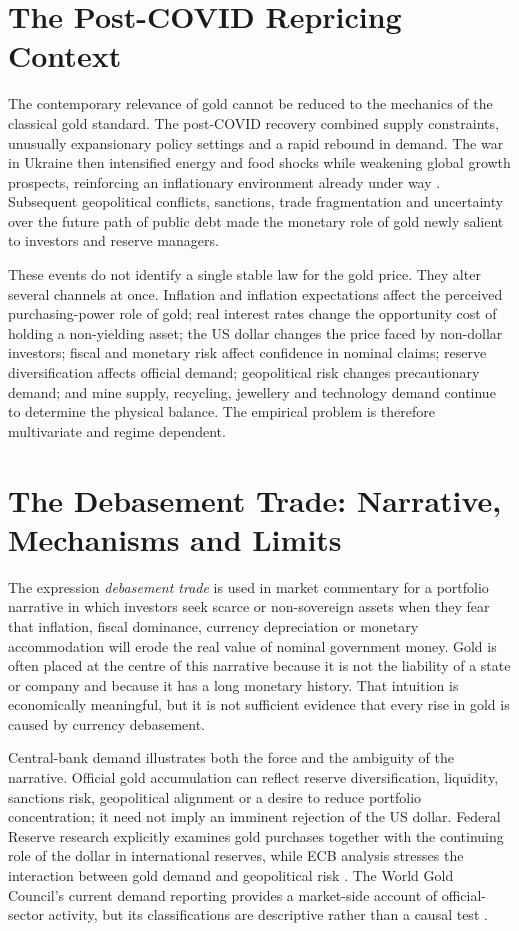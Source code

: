 \section{The Post-COVID Repricing Context}

The contemporary relevance of gold cannot be reduced to the mechanics of the
classical gold standard. The post-COVID recovery combined supply constraints,
unusually expansionary policy settings and a rapid rebound in demand. The war
in Ukraine then intensified energy and food shocks while weakening global
growth prospects, reinforcing an inflationary environment already under way
\cite{imf-war-inflation-2022}. Subsequent geopolitical conflicts, sanctions,
trade fragmentation and uncertainty over the future path of public debt made
the monetary role of gold newly salient to investors and reserve managers.

These events do not identify a single stable law for the gold price. They alter
several channels at once. Inflation and inflation expectations affect the
perceived purchasing-power role of gold; real interest rates change the
opportunity cost of holding a non-yielding asset; the US dollar changes the
price faced by non-dollar investors; fiscal and monetary risk affect confidence
in nominal claims; reserve diversification affects official demand;
geopolitical risk changes precautionary demand; and mine supply, recycling,
jewellery and technology demand continue to determine the physical balance.
The empirical problem is therefore multivariate and regime dependent.

\section{The Debasement Trade: Narrative, Mechanisms and Limits}

The expression \emph{debasement trade} is used in market commentary for a
portfolio narrative in which investors seek scarce or non-sovereign assets
when they fear that inflation, fiscal dominance, currency depreciation or
monetary accommodation will erode the real value of nominal government money.
Gold is often placed at the centre of this narrative because it is not the
liability of a state or company and because it has a long monetary history.
That intuition is economically meaningful, but it is not sufficient evidence
that every rise in gold is caused by currency debasement.

Central-bank demand illustrates both the force and the ambiguity of the
narrative. Official gold accumulation can reflect reserve diversification,
liquidity, sanctions risk, geopolitical alignment or a desire to reduce
portfolio concentration; it need not imply an imminent rejection of the US
dollar. Federal Reserve research explicitly examines gold purchases together
with the continuing role of the dollar in international reserves, while ECB
analysis stresses the interaction between gold demand and geopolitical risk
\cite{fed-gold-reserves-2025,ecb-gold-risk-2025}. The World Gold Council's
current demand reporting provides a market-side account of official-sector
activity, but its classifications are descriptive rather than a causal test
\cite{wgc-gdt-q2-2026}.

